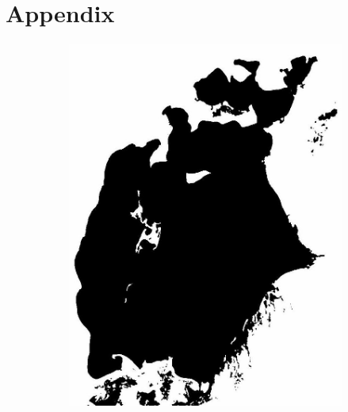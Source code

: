 \documentclass[12pt,a4paper]{article}
\begin{document}
\section{Appendix}
\begin{figure}
     \centering
     \begin{subfigure}[b]{0.19\textwidth}
         \centering
         \includegraphics[width=\textwidth]{../img/1977w.jpg}
         \caption{}
         \label{fig:}
     \end{subfigure}
     \begin{subfigure}[b]{0.19\textwidth}
         \centering

\end{subfigure}
\end{figure}
\end{document}
